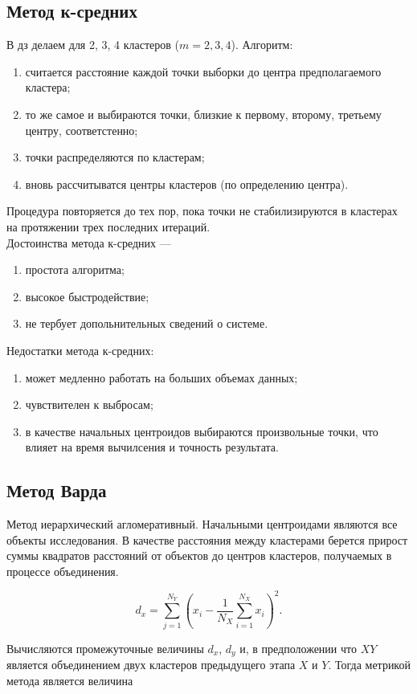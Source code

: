 \documentclass[12pt]{article}
\begin{document}
\subsection{Метод к-средних}
В дз делаем для 2, 3, 4 кластеров ($m = 2, 3, 4$). Алгоритм:
\begin{enumerate}
    \item считается расстояние каждой точки выборки до центра предполагаемого кластера;
    \item то же самое и выбираются точки, близкие к первому, второму, третьему центру, соответстенно;
    \item точки распределяются по кластерам;
    \item вновь рассчитыватся центры кластеров (по определению центра).
\end{enumerate}
Процедура повторяется до тех пор, пока точки не стабилизируются в кластерах на протяжении трех последних итераций.\\

Достоинства метода к-средних ---
\begin{enumerate}
    \item простота алгоритма;
    \item высокое быстродействие;
    \item не тербует допольнительных сведений о системе.
\end{enumerate}

Недостатки метода к-средних:
\begin{enumerate}
    \item может медленно работать на больших объемах данных;
    \item чувствителен к выбросам;
    \item в качестве начальных центроидов выбираются произвольные точки, что влияет на время вычилсения и точность результата.
\end{enumerate}

\subsection{Метод Варда}
Метод иерархический агломеративный. Начальными центроидами являются все объекты исследования. В качестве расстояния между кластерами берется прирост суммы квадратов расстояний от объектов до центров кластеров, получаемых в процессе объединения.

\[ d_x = \sum_{j=1}^{N_Y} \left( x_i - \frac{1}{N_X} \sum_{i=1}^{N_X} x_i \right)^2. \]

Вычисляются промежуточные величины $d_x$, $d_y$ и, в предположении что $XY$ является объединением двух кластеров предыдущего этапа $X$ и $Y$. Тогда метрикой метода является величина
\end{document}
